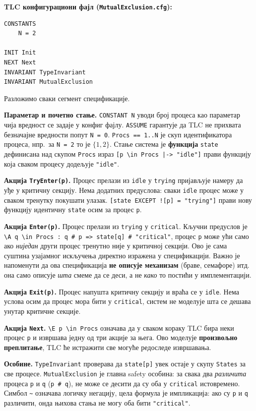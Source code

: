 \begin{primer}
\textbf{TLC конфигурациони фајл (\texttt{MutualExclusion.cfg}):}
\begin{lstlisting}
CONSTANTS
    N = 2

INIT Init
NEXT Next
INVARIANT TypeInvariant
INVARIANT MutualExclusion
\end{lstlisting}

Разложимо сваки сегмент спецификације.

\textbf{Параметар и почетно стање.}
\texttt{CONSTANT N} уводи број процеса као параметар чија вредност се задаје у конфиг фајлу.
\texttt{ASSUME} гарантује да TLC не прихвата безначајне вредности попут \texttt{N = 0}.
\texttt{Procs == 1..N} је скуп идентификатора процеса, нпр.\ за \texttt{N = 2} то је $\{1, 2\}$.
Стање система је \textbf{функција} \texttt{state} дефинисана над скупом \texttt{Procs} израз
\texttt{[p \textbackslash in Procs |-> "idle"]} прави функцију која сваком процесу додељује \texttt{"idle"}.

\textbf{Акција \texttt{TryEnter(p)}.}
Процес прелази из \texttt{idle} у \texttt{trying}  пријављује намеру да уђе у критичну секцију.
Нема додатних предуслова: сваки \texttt{idle} процес може у сваком тренутку покушати улазак.
\texttt{[state EXCEPT ![p] = "trying"]} прави нову функцију идентичну \texttt{state} осим за процес \texttt{p}.

\textbf{Акција \texttt{Enter(p)}.}
Процес прелази из \texttt{trying} у \texttt{critical}.
Кључни предуслов је \texttt{\textbackslash A q \textbackslash in Procs : q \# p => state[q] \# "critical"},
процес \texttt{p} може ући само ако \emph{ниједан} други процес тренутно није у критичној секцији.
Ово је сама суштина узајамног искључења директно изражена у спецификацији.
Важно је напоменути да ова спецификација \textbf{не описује механизам} (браве, семафоре) итд. она само
описује \emph{шта} смеме да се деси, а не \emph{како} то постићи у имплементацији.

\textbf{Акција \texttt{Exit(p)}.}
Процес напушта критичну секцију и враћа се у \texttt{idle}.
Нема услова осим да процес мора бити у \texttt{critical}, систем не моделује шта се дешава унутар критичне секције.

\textbf{Акција \texttt{Next}.}
\texttt{\textbackslash E p \textbackslash in Procs} означава да у сваком кораку TLC бира неки процес \texttt{p}
и извршава једну од три акције за њега. Ово моделује \textbf{произвољно преплитање}, TLC ће
истражити све могуће редоследе извршавања.

\textbf{Особине.}
\texttt{TypeInvariant} проверава да \texttt{state[p]} увек остаје у скупу \texttt{States} за све процесе.
\texttt{MutualExclusion} је главна safety особина: за свака два \emph{различита} процеса \texttt{p} и \texttt{q}
(\texttt{p \# q}), не може се десити да су оба у \texttt{critical} истовремено.
Симбол \texttt{\textasciitilde} означава логичку негацију, цела формула је импликација: ако су \texttt{p} и \texttt{q} различити, онда њихова стања не могу оба бити \texttt{"critical"}.
\end{primer}

